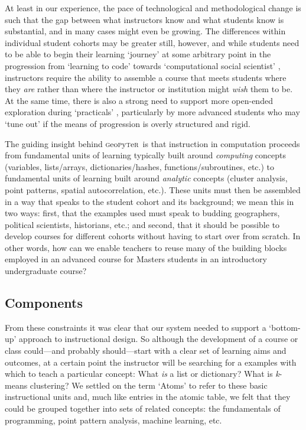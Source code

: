 \documentclass[letter, 11pt,titlepage]{article}
\newcommand{\gp}{\textsc{g}eo\textsc{p}y\textsc{t}e\textsc{r}~\/}
\begin{document}
At least in our experience, the pace of technological and methodological change
is such that the gap between what instructors know and what students know is
substantial, and in many cases might even be growing. The differences within
individual student cohorts may be greater still, however, and while students
need to be able to begin their learning `journey' at some arbitrary point in the
progression from `learning to code' towards `computational social scientist'
\citep{Lazer2009}, instructors require the ability to assemble a course that
meets students where they \emph{are} rather than where the instructor or
institution might \emph{wish} them to be. At the same time, there is also a strong need to support more open-ended exploration during `practicals' \citep{Unwin1980}, particularly by more advanced students who may `tune out' if the means of progression is overly structured and rigid.

The guiding insight behind \gp is that instruction in computation proceeds from
fundamental units of learning typically built around \textit{computing} concepts
(variables, lists/arrays, dictionaries/hashes, functions/subroutines, etc.) to
fundamental units of learning built around \textit{analytic} concepts (cluster
analysis, point patterns, spatial autocorrelation, etc.). These units must then
be assembled in a way that speaks to the student cohort and its background; we
mean this in two ways: first, that the examples used must speak to budding
geographers, political scientists, historians, etc.; and second, that it should
be possible to develop courses for different cohorts without having to start
over from scratch. In other words, how can we enable teachers to reuse many of
the building blocks employed in an advanced course for Masters students in an
introductory undergraduate course?

\subsection{Components}\label{components}

From these constraints it was clear that our system needed to support a
`bottom-up' approach to instructional design. So although the development of a
course or class could---and probably should---start with a clear set of learning
aims and outcomes, at a certain point the instructor will be searching for a
examples with which to teach a particular concept: What \emph{is} a list or
dictionary? What is \textit{k}-means clustering? We settled on the term `Atoms'
to refer to these basic instructional units and, much like entries in the atomic
table, we felt that they could be grouped together into sets of related
concepts: the fundamentals of programming, point pattern analysis, machine
learning, etc.
\end{document}
